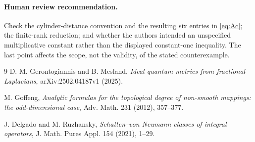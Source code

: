 \documentclass[11pt]{article}
\begin{document}
\paragraph{Human review recommendation.}
Check the cylinder-distance convention and the resulting six entries in
\eqref{eq:Ac}; the finite-rank reduction; and whether the authors intended an
unspecified multiplicative constant rather than the displayed constant-one
inequality.  The last point affects the scope, not the validity, of the stated
counterexample.

\begin{thebibliography}{9}
D. M. Gerontogiannis and B. Mesland,
\emph{Ideal quantum metrics from fractional Laplacians},
arXiv:2502.04187v1 (2025).

M. Goffeng,
\emph{Analytic formulas for the topological degree of non-smooth mappings:
the odd-dimensional case},
Adv. Math. 231 (2012), 357--377.

J. Delgado and M. Ruzhansky,
\emph{Schatten--von Neumann classes of integral operators},
J. Math. Pures Appl. 154 (2021), 1--29.
\end{thebibliography}
\end{document}
